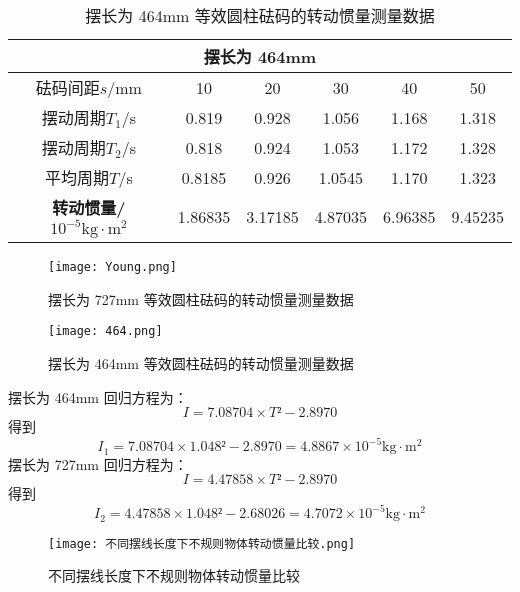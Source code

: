 \begin{table}[h!]
    \centering
    \renewcommand{\arraystretch}{1.5}
    \setlength{\tabcolsep}{8pt}
    \begin{tabular}{|c|c|c|c|c|c|}
    \hline
    \multicolumn{6}{|c|}{\textbf{摆长为 464mm}} \\ \hline
    砝码间距$s$/mm & 10 & 20 & 30 & 40 & 50 \\ \hline
    摆动周期$T_1$/s & 0.819 & 0.928 & 1.056 & 1.168 & 1.318 \\ \hline
    摆动周期$T_2$/s & 0.818 & 0.924 & 1.053 & 1.172 & 1.328 \\ \hline
    平均周期$T$/s & 0.8185 & 0.926 & 1.0545 & 1.170 & 1.323 \\ \hline
    \textbf{转动惯量/ $ \mathrm{10^{-5}kg \cdot m^2} $} & 1.86835 & 3.17185 & 4.87035 & 6.96385 & 9.45235 \\ \hline
    \end{tabular}
    \caption{摆长为 464mm 等效圆柱砝码的转动惯量测量数据}
    \label{tab:raw_data_simplified}
\end{table}


\begin{figure}[h!]
    \centering
    \begin{minipage}{0.48\textwidth}
        \centering
        \texttt{[image: Young.png]}
        \caption{摆长为 727mm 等效圆柱砝码的转动惯量测量数据}
        \label{fig:irregular_data_727}
    \end{minipage}
    \hfill
    \begin{minipage}{0.48\textwidth}
        \centering
        \texttt{[image: 464.png]}
        \caption{摆长为 464mm 等效圆柱砝码的转动惯量测量数据}
        \label{fig:irregular_data_464}
    \end{minipage}
\end{figure}

摆长为 464mm 回归方程为：
$$
I = 7.08704 \times T²  -2.8970
$$
得到
$$
I_1 = 7.08704 \times 1.048²  -2.8970=4.8867\times  \mathrm{10^{-5}kg \cdot m^2} 
$$
摆长为 727mm 回归方程为：
$$
I = 4.47858 \times T²  -2.8970
$$
得到
$$
I_2 = 4.47858 \times 1.048²  -2.68026=4.7072\times \mathrm{10^{-5}kg \cdot m^2} 
$$

\begin{figure}
    \centering
        \texttt{[image: 不同摆线长度下不规则物体转动惯量比较.png]}
        \caption{不同摆线长度下不规则物体转动惯量比较}
        \label{fig:irregular_data_464}
\end{figure}

\newpage
